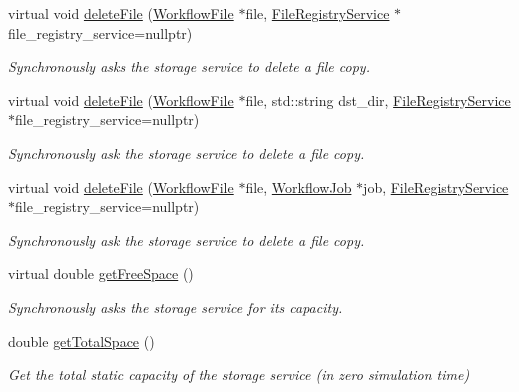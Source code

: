 \begin{DoxyCompactItemize}
virtual void \hyperlink{classwrench_1_1_storage_service_a49becac571e80a1a89f2466cad3fc084}{delete\+File} (\hyperlink{classwrench_1_1_workflow_file}{Workflow\+File} $\ast$file, \hyperlink{classwrench_1_1_file_registry_service}{File\+Registry\+Service} $\ast$file\+\_\+registry\+\_\+service=nullptr)
\begin{DoxyCompactList}\small\item\em Synchronously asks the storage service to delete a file copy. \end{DoxyCompactList}\item 
virtual void \hyperlink{classwrench_1_1_storage_service_abc410d2a2155aaa78bea3c38209dcc37}{delete\+File} (\hyperlink{classwrench_1_1_workflow_file}{Workflow\+File} $\ast$file, std\+::string dst\+\_\+dir, \hyperlink{classwrench_1_1_file_registry_service}{File\+Registry\+Service} $\ast$file\+\_\+registry\+\_\+service=nullptr)
\begin{DoxyCompactList}\small\item\em Synchronously ask the storage service to delete a file copy. \end{DoxyCompactList}\item 
virtual void \hyperlink{classwrench_1_1_storage_service_a60e3da9c453f18fabaaf0cd92cc2a751}{delete\+File} (\hyperlink{classwrench_1_1_workflow_file}{Workflow\+File} $\ast$file, \hyperlink{classwrench_1_1_workflow_job}{Workflow\+Job} $\ast$job, \hyperlink{classwrench_1_1_file_registry_service}{File\+Registry\+Service} $\ast$file\+\_\+registry\+\_\+service=nullptr)
\begin{DoxyCompactList}\small\item\em Synchronously ask the storage service to delete a file copy. \end{DoxyCompactList}\item 
virtual double \hyperlink{classwrench_1_1_storage_service_a600a2fc0da8e1c5f1159509f09c2f2f6}{get\+Free\+Space} ()
\begin{DoxyCompactList}\small\item\em Synchronously asks the storage service for its capacity. \end{DoxyCompactList}\item 
double \hyperlink{classwrench_1_1_storage_service_a0ea24bcd9b320bde776b64dd8e4cd494}{get\+Total\+Space} ()
\begin{DoxyCompactList}\small\item\em Get the total static capacity of the storage service (in zero simulation time) \end{DoxyCompactList}\item 

\end{DoxyCompactItemize}
